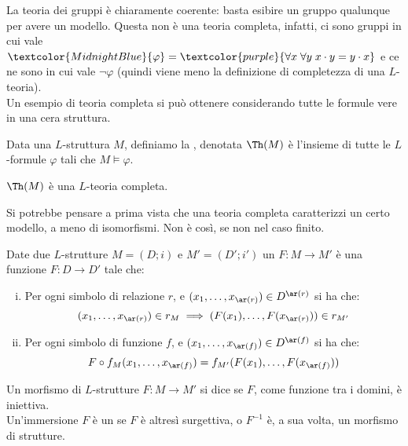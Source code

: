 La teoria dei gruppi è chiaramente coerente: basta esibire un gruppo qualunque per avere un modello. Questa non è una teoria completa, infatti, ci sono gruppi in cui vale
$\textcolor{MidnightBlue}{\varphi} = \textcolor{purple}{\forall x \; \forall y \; x \cdot y = y \cdot x}$ e ce ne sono in cui vale $\neg \varphi$ (quindi viene meno la definizione di completezza di una $L$-teoria).\\
Un esempio di teoria completa si può ottenere considerando tutte le formule vere in una cera struttura.

\begin{definition}
    Data una $L$-struttura $M$, definiamo la , denotata $\Th(M)$ è l'insieme di tutte le $L$-formule $\varphi$ tali che $M \models \varphi$.
\end{definition}

\begin{remark}
    $\Th(M)$ è una $L$-teoria completa.
\end{remark}

Si potrebbe pensare a prima vista che una teoria completa caratterizzi un certo modello, a meno di isomorfismi. Non è così, se non nel caso finito.

\begin{definition}
    Date due $L$-strutture $M = (D;i)$ e $M' = (D';i')$ un  $F : M \to M'$ è una funzione $F : D \to D'$ tale che:
    \begin{enumerate}[(i)]
        \item Per ogni simbolo di relazione $r$, e $(x_1,\ldots,x_{\ar(r)}) \in D^{\ar(r)}$ si ha che:
        \[ (x_1,\ldots,x_{\ar(r)}) \in r_M \implies (F(x_1),\ldots,F(x_{\ar(r)})) \in r_{M'}
        \]
        \item Per ogni simbolo di funzione $f$, e $(x_1,\ldots,x_{\ar(f)}) \in D^{\ar(f)}$ si ha che:
        \[ F \circ f_M(x_1,\ldots,x_{\ar(f)}) = f_{M'}(F(x_1),\ldots,F(x_{\ar(f)}))
        \]
    \end{enumerate}  
\end{definition}

\begin{definition}
    Un morfismo di $L$-strutture $F : M \to M'$ si dice  se $F$, come funzione tra i domini, è iniettiva.\\
    Un'immersione $F$ è un  se $F$ è altresì surgettiva, o $F^{-1}$ è, a sua volta, un morfismo di strutture.
\end{definition}

